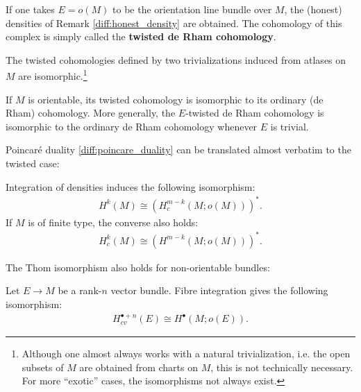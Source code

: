    If one takes $E=o(M)$ to be the orientation line bundle over $M$, the (honest) densities of Remark \ref{diff:honest_density} are obtained. The cohomology of this complex is simply called the \textbf{twisted de Rham cohomology}.
    \begin{property}[Isomorphism]
        The twisted cohomologies defined by two trivializations induced from atlases on $M$ are isomorphic.\footnote{Although one almost always works with a natural trivialization, i.e. the open subsets of $M$ are obtained from charts on $M$, this is not technically necessary. For more ``exotic'' cases, the isomorphisms not always exist.}
    \end{property}
    \begin{property}
        If $M$ is orientable, its twisted cohomology is isomorphic to its ordinary (de Rham) cohomology. More generally, the $E$-twisted de Rham cohomology is isomorphic to the ordinary de Rham cohomology whenever $E$ is trivial.
    \end{property}

    Poincar\'e duality \ref{diff:poincare_duality} can be translated almost verbatim to the twisted case:
    \begin{theorem}
        Integration of densities induces the following isomorphism:
        \begin{gather}
            H^k(M)\cong\left(H^{m-k}_c(M; o(M))\right)^*.
        \end{gather}
        If $M$ is of finite type, the converse also holds:
        \begin{gather}
            H^k_c(M)\cong\left(H^{m-k}(M; o(M))\right)^*.
        \end{gather}
    \end{theorem}
    The Thom isomorphism also holds for non-orientable bundles:
    \begin{theorem}
        Let $E\rightarrow M$ be a rank-$n$ vector bundle. Fibre integration gives the following isomorphism:
        \begin{gather}
            H^{\bullet+n}_{cv}(E)\cong H^\bullet(M; o(E)).
        \end{gather}
    \end{theorem}